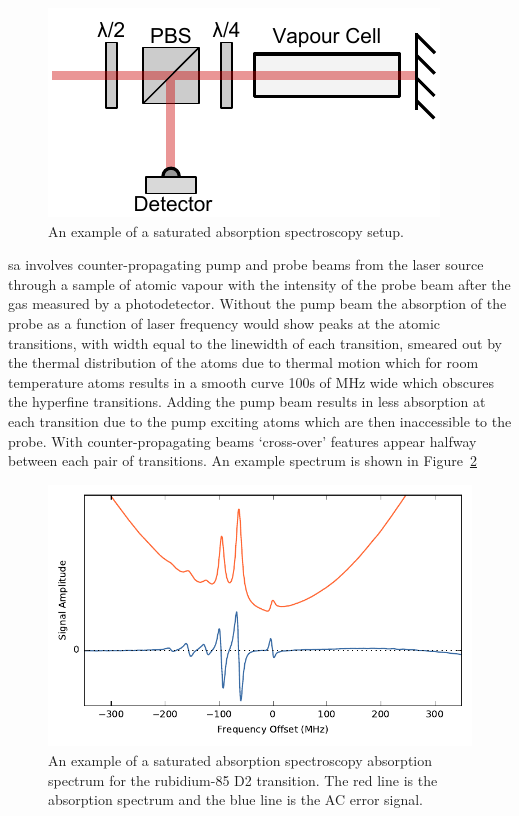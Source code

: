 \begin{figure}
\includegraphics[width=\linewidth]{part1/Figs/SatAbs.pdf}
\caption{An example of a saturated absorption spectroscopy setup.}
\label{figure:satabs}
\end{figure}

\Gls{sa} involves counter-propagating pump and probe beams from the laser source through a sample of atomic vapour with the intensity of the probe beam after the gas measured by a photodetector. Without the pump beam the absorption of the probe as a function of laser frequency would show peaks at the atomic transitions, with width equal to the linewidth of each transition, smeared out by the thermal distribution of the atoms due to thermal motion which for room temperature atoms results in a smooth curve 100s of MHz wide which obscures the hyperfine transitions. Adding the pump beam results in less absorption at each transition due to the pump exciting atoms which are then inaccessible to the probe. With counter-propagating beams `cross-over' features appear halfway between each pair of transitions. An example spectrum is shown in Figure~\ref{figure:satabsspectrum}

\begin{figure}
\includegraphics[width=\linewidth]{part1/Figs/SatAbsSpectrum.pdf}
\caption{An example of a saturated absorption spectroscopy absorption spectrum for the rubidium-85 D2 transition. The red line is the absorption spectrum and the blue line is the AC error signal.}
\label{figure:satabsspectrum}
\end{figure}

